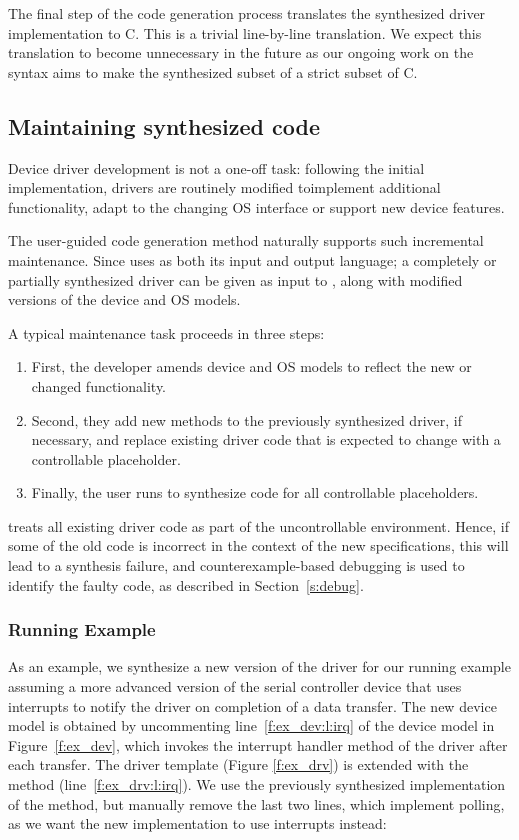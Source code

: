 The final step of the code generation process translates the synthesized driver implementation to C.  This is a trivial line-by-line translation.  We expect this translation to become unnecessary in the future as our ongoing work on the \tsl syntax aims to make the synthesized subset of \tsl a strict subset of C.

\subsection{Maintaining synthesized code~~} 
Device driver development is not a one-off task: following the initial implementation, drivers are routinely modified toimplement additional functionality, adapt to the changing OS interface or support new device features.

The user-guided code generation method naturally supports such incremental maintenance. Since \termite uses \tsl as both its input and output language;  a completely or partially synthesized driver can be given as input to \termite, along with modified versions of the device and OS models.

A typical maintenance task proceeds in three steps:

\begin{enumerate}
    \item First, the developer amends device and OS models to reflect the new or changed functionality.  
    \item Second, they add new methods to the previously synthesized driver, if necessary, and replace existing driver code that is expected to change with a controllable  placeholder.  
    \item Finally, the user runs \termite to synthesize code for all controllable placeholders.  
\end{enumerate}
        
\termite treats all existing driver code as part of the uncontrollable environment.  Hence, if some of the old code is incorrect in the context of the new specifications, this will lead to a synthesis failure, and counterexample-based debugging is used to identify the faulty code, as described in Section~\ref{s:debug}.

\subsubsection{Running Example}

As an example, we synthesize a new version of the driver for our running example assuming a more advanced version of the serial controller device that uses interrupts to notify the driver on completion of a data transfer.  The new device model is obtained by uncommenting line~\ref{f:ex_dev:l:irq} of the device model in Figure~\ref{f:ex_dev}, which invokes the interrupt handler method of the driver after each transfer.  The driver template (Figure \ref{f:ex_drv}) is extended with the  method (line~\ref{f:ex_drv:l:irq}).  We use the previously synthesized implementation of the  method, but manually remove the last two lines, which implement polling, as we want the new implementation to use interrupts instead:

